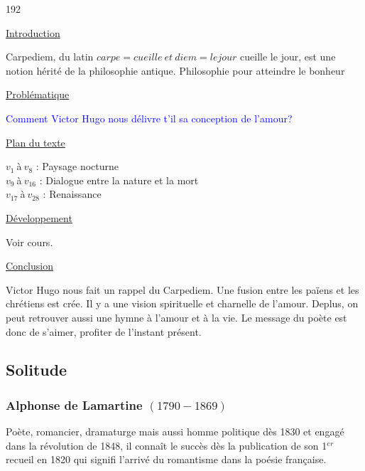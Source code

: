 \documentclass[12pt,a4paper]{article}
\begin{document}
\begin{dingautolist}{192}

\item \underline{Introduction} \par
	Carpediem, du latin $carpe = cueille~et~diem = le jour$ cueille le jour, est une notion h\'erit\'e de la philosophie antique. Philosophie pour atteindre le bonheur 

\item \underline{Probl\'ematique }\par
		\textcolor{blue}{Comment Victor Hugo nous d\'elivre t'il sa conception de l'amour?}

\item \underline{Plan du texte} \par
		$v_{1}~$\`a$~v_{8}$ : Paysage nocturne\\
        $v_{9}~$\`a$~v_{16}$ : Dialogue entre la nature et la mort\\
        $v_{17}~$\`a$~v_{28}$ : Renaissance

\item \underline{D\'eveloppement} \par
	Voir cours.

\item \underline{Conclusion} \par
	Victor Hugo nous fait un rappel du Carpediem.
Une fusion entre les pa\"iens et les chr\'etiens est cr\'ee. Il y a une vision spirituelle et charnelle de l'amour. Deplus, on peut retrouver aussi une hymne \`a l'amour et \`a la vie.
Le message du po\`ete est donc de s'aimer, profiter de l'instant pr\'esent. 

\end{dingautolist}	

 \newpage
			\subsection{Solitude}
				\subsubsection{Alphonse de Lamartine $(1790-1869)$}
		Po\`ete, romancier, dramaturge mais aussi homme politique d\`es 1830 et engag\'e dans la r\'evolution de 1848, il conna\^it le succ\`es d\`es la publication de son 1$^{er}$ recueil en 1820 
		qui signifi l'arriv\'e du romantisme dans la po\'esie fran\c caise.
\end{document}
